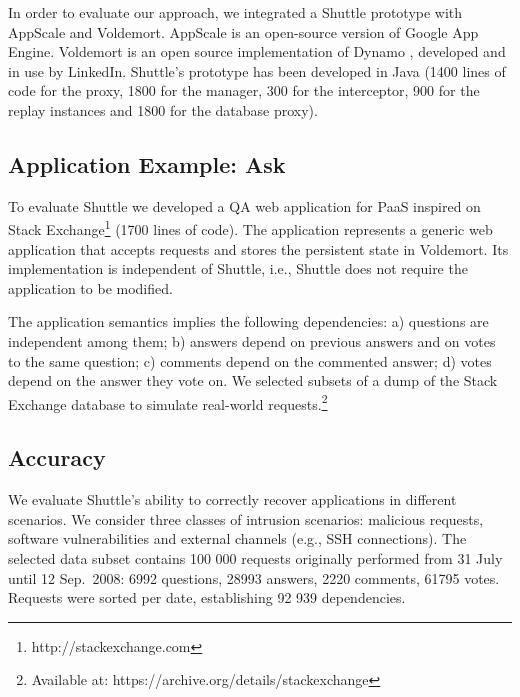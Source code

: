 \documentclass[10pt,conference]{IEEEtran}
\newcommand{\LONG}[1]{}
\begin{document}
In order to evaluate our approach, we integrated a Shuttle prototype with AppScale and Voldemort. AppScale \cite{Appscale} is an open-source version of Google App Engine. Voldemort \cite{Kreps} is an open source implementation of Dynamo \cite{Decandia2007}, developed and in use by LinkedIn. Shuttle’s prototype has been developed in Java (1400 lines of code for the proxy, 1800 for the manager, 300 for the interceptor, 900 for the replay instances and 1800 for the database proxy).


\subsection{Application Example: Ask}
\label{sec:evaluation:app}

To evaluate Shuttle we developed a \acf{QA} web application for \ac{PaaS} inspired on Stack Exchange\footnote{http://stackexchange.com} (1700 lines of code). The application represents a generic web application that accepts requests and stores the persistent state in  Voldemort. Its implementation is independent of Shuttle, i.e., Shuttle does not require the application to be modified. 

The application semantics implies the following dependencies: a) questions are independent among them; b) answers depend on previous answers and on votes to the same question; c) comments depend on the commented answer; d) votes depend on the answer they vote on. We selected subsets of a dump of the Stack Exchange database to simulate real-world requests.\footnote{Available at: https://archive.org/details/stackexchange} 

\subsection{Accuracy}
\label{sec:evaluation:accuracy}

We evaluate Shuttle's ability to correctly recover applications in different scenarios. We consider three classes of intrusion scenarios: malicious requests, software vulnerabilities and external channels (e.g., SSH connections). The selected data subset contains 100 000 requests originally performed from 31 July until 12 Sep.~2008: 6992 questions, 28993 answers, 2220 comments, 61795 votes\DIFdelbegin {}\DIFdelend \DIFaddbegin \DIFadd{\LONG{ and 3062 tags}}\DIFaddend . Requests were sorted per date, establishing 92 939 dependencies.
\end{document}
